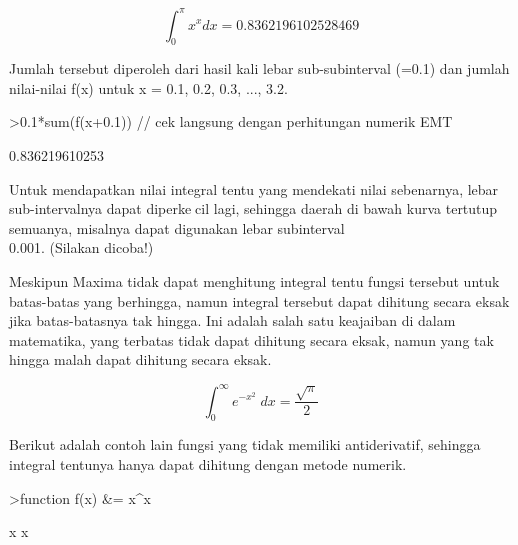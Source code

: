 \documentclass[a4paper,10pt]{article}
\begin{document}
\begin{eulernotebook}
\begin{eulercomment}
\begin{eulercomment}
\begin{eulercomment}
\begin{eulercomment}
\begin{eulercomment}
\begin{eulercomment}
\begin{eulercomment}
\begin{eulercomment}
\begin{eulercomment}
\begin{eulercomment}
\begin{eulercomment}
\end{eulercomment}
\begin{eulerformula}
\[
\int_{0}^{\pi}x^x dx=0.8362196102528469
\]
\end{eulerformula}
\begin{eulercomment}
Jumlah tersebut diperoleh dari hasil kali lebar sub-subinterval (=0.1)
dan jumlah nilai-nilai f(x) untuk x = 0.1, 0.2, 0.3, ..., 3.2.
\end{eulercomment}
\begin{eulerprompt}
>0.1*sum(f(x+0.1)) // cek langsung dengan perhitungan numerik EMT
\end{eulerprompt}
\begin{euleroutput}
  0.836219610253
\end{euleroutput}
\begin{eulercomment}
Untuk mendapatkan nilai integral tentu yang mendekati nilai
sebenarnya, lebar sub-intervalnya dapat diperkecil lagi, sehingga
daerah di bawah kurva tertutup semuanya, misalnya dapat digunakan
lebar subinterval\\
0.001. (Silakan dicoba!)

Meskipun Maxima tidak dapat menghitung integral tentu fungsi tersebut
untuk batas-batas yang berhingga, namun integral tersebut dapat
dihitung secara eksak jika batas-batasnya tak hingga. Ini adalah salah
satu keajaiban di dalam matematika, yang terbatas tidak dapat dihitung
secara eksak, namun yang tak hingga malah dapat dihitung secara eksak.
\end{eulercomment}
\begin{eulerformula}
\[
\int_{0}^{\infty }{e^ {- x^2 }\;dx}=\frac{\sqrt{\pi}}{2}
\]
\end{eulerformula}
\begin{eulercomment}
Berikut adalah contoh lain fungsi yang tidak memiliki antiderivatif,
sehingga integral tentunya hanya dapat dihitung dengan metode numerik.
\end{eulercomment}
\begin{eulerprompt}
>function f(x) &= x^x
\end{eulerprompt}
\begin{euleroutput}
  
                                     x
                                    x
  

\end{euleroutput}
\end{eulercomment}
\end{eulercomment}
\end{eulercomment}
\end{eulercomment}
\end{eulercomment}
\end{eulercomment}
\end{eulercomment}
\end{eulercomment}
\end{eulercomment}
\end{eulercomment}
\end{eulernotebook}
\end{document}
